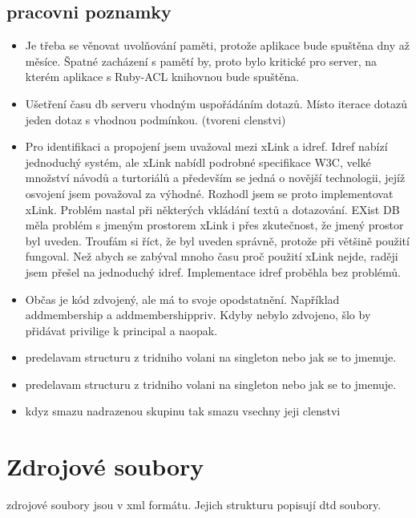 \subsection{pracovni poznamky}
\begin{itemize}
\item Je třeba se věnovat uvolňování paměti, protože aplikace bude spuštěna dny až měsíce. Špatné zacházení s pamětí by, proto bylo kritické pro server, na kterém aplikace s Ruby-ACL knihovnou bude spuštěna.
\item Ušetření času db serveru vhodným uspořádáním dotazů. Místo iterace dotazů jeden dotaz s vhodnou podmínkou. (tvoreni clenstvi) 
\item Pro identifikaci a propojení jsem uvažoval mezi xLink a idref. Idref nabízí jednoduchý systém, ale xLink nabídl podrobné specifikace W3C, velké množství návodů a turtoriálů a především se jedná o novější technologii, jejíž osvojení jsem považoval za výhodné. Rozhodl jsem se proto implementovat xLink. Problém nastal při některých vkládání textů a dotazování. EXist DB měla problém s jmeným prostorem xLink i přes zkutečnost, že jmený prostor byl uveden. Troufám si říct, že byl uveden správně, protože při většině použití fungoval. Než abych se zabýval mnoho času proč použití xLink nejde, raději jsem přešel na jednoduchý idref. Implementace idref proběhla bez problémů.
\item Občas je kód zdvojený, ale má to svoje opodstatnění. Například addmembership a addmembershippriv. Kdyby nebylo zdvojeno, šlo by přidávat privilige k principal a naopak.
\item predelavam structuru z tridniho volani na singleton nebo jak se to jmenuje.\item predelavam structuru z tridniho volani na singleton nebo jak se to jmenuje.
\item kdyz smazu nadrazenou skupinu tak smazu vsechny jeji clenstvi
\end{itemize}

\section{Zdrojové soubory}
zdrojové soubory jsou v xml formátu. Jejich strukturu popisují dtd soubory.